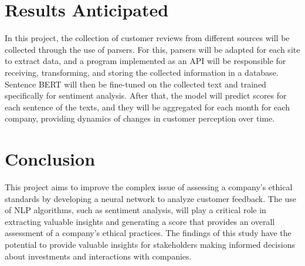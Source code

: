 \documentclass[PI]{ProjectProposal}
\begin{document}
\chapter{Results Anticipated}
\label{sec:org6b5ca5b}
In this project, the collection of customer reviews from different sources will be collected through the use of parsers. For this, parsers will be adapted for each site to extract data, and a program implemented as an API will be responsible for receiving, transforming, and storing the collected information in a database. Sentence BERT will then be fine-tuned on the collected text and trained specifically for sentiment analysis. After that, the model will predict scores for each sentence of the texts, and they will be aggregated for each month for each company, providing dynamics of changes in customer perception over time.
\chapter{Conclusion}
\label{sec:org609fe67}
This project aims to improve the complex issue of assessing a company's ethical standards by developing a neural network to analyze customer feedback. The use of NLP algorithms, such as sentiment analysis, will play a critical role in extracting valuable insights and generating a score that provides an overall assessment of a company's ethical practices. The findings of this study have the potential to provide valuable insights for stakeholders making informed decisions about investments and interactions with companies.

\putbibliography
\appendix
\end{document}
